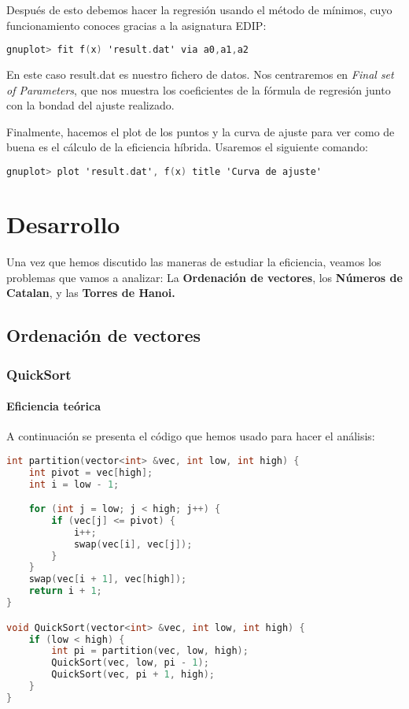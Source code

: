 \documentclass[a4paper,12pt]{article} %
\begin{document}
Después de esto debemos hacer la regresión usando el método de mínimos, cuyo funcionamiento conoces gracias a la asignatura EDIP:

\begin{lstlisting}[language=C, caption={Uso de gnuplot para la regresión}]
        gnuplot> fit f(x) 'result.dat' via a0,a1,a2
         \end{lstlisting}

En este caso result.dat es nuestro fichero de datos.
Nos centraremos en \textit{Final set of Parameters}, que nos muestra los coeficientes de la fórmula de regresión
junto con la bondad del ajuste realizado.

Finalmente, hacemos el plot de los puntos y la curva de ajuste para ver como de buena es el cálculo de la eficiencia híbrida. Usaremos el
siguiente comando:

\begin{lstlisting}[language=C, caption={Representación de la regresión}]
        gnuplot> plot 'result.dat', f(x) title 'Curva de ajuste'
         \end{lstlisting}




\section{Desarrollo}
Una vez que hemos discutido las maneras de estudiar la eficiencia, veamos los problemas
que vamos a analizar: La \textbf{Ordenación de vectores},
los \textbf{Números de Catalan}, y las \textbf{Torres de Hanoi.}

\subsection{Ordenación de vectores}
\subsubsection{QuickSort}
\paragraph{Eficiencia teórica}

A continuación se presenta el código que hemos usado para hacer el análisis:

\begin{lstlisting}[language=C++, caption={Código de QuickSort}]
int partition(vector<int> &vec, int low, int high) {
	int pivot = vec[high];
	int i = low - 1;

	for (int j = low; j < high; j++) {
		if (vec[j] <= pivot) {
			i++;
			swap(vec[i], vec[j]);
		}
	}
	swap(vec[i + 1], vec[high]);
	return i + 1;
}

void QuickSort(vector<int> &vec, int low, int high) {
	if (low < high) {
		int pi = partition(vec, low, high);
		QuickSort(vec, low, pi - 1);
		QuickSort(vec, pi + 1, high);
	}
}
\end{lstlisting}
\end{document}
